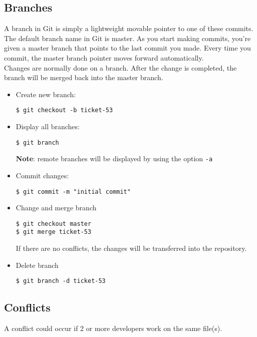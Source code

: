 \subsection{Branches}
A branch in Git is simply a lightweight movable pointer to one of these
commits. The default branch name in Git is master. As you start making
commits, you’re given a master branch that points to the last commit you
made. Every time you commit, the master branch pointer moves forward
automatically.\\
Changes are normally done on a branch. After the change is completed, the
branch will be merged back into the master branch.
\begin{itemize}
\item Create new branch:
\begin{lstlisting}
$ git checkout -b ticket-53
\end{lstlisting}
\item Display all branches:
  \begin{lstlisting}
$ git branch
  \end{lstlisting}
{\bfseries Note}: remote branches will be displayed by using the option
\verb|-a|
\item Commit changes:
  \begin{lstlisting}
$ git commit -m "initial commit"
  \end{lstlisting}
\item Change and merge branch
  \begin{lstlisting}
$ git checkout master
$ git merge ticket-53
  \end{lstlisting}
  If there are no conflicts, the changes will be transferred into the
  repository.
\item Delete branch
  \begin{lstlisting}
$ git branch -d ticket-53
  \end{lstlisting}
\end{itemize}
%
\newslide
\subsection{Conflicts}
A conflict could occur if 2 or more developers work on the same file(s).

